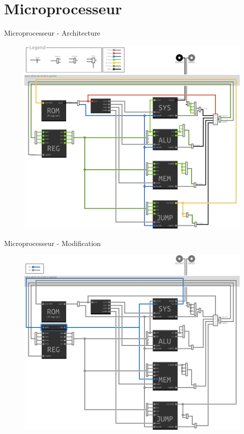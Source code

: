 \documentclass{beamer}
\begin{document}
\section{Microprocesseur}
\begin{frame}{Microprocesseur - Architecture}
	\begin{figure}
		\centering
		\includegraphics[width=\textwidth,height=0.9\textheight,keepaspectratio]{archi}
	\end{figure}
\end{frame}

\begin{frame}{Microprocesseur - Modification}
	\begin{figure}
		\centering
		\includegraphics[width=\textwidth,height=0.9\textheight,keepaspectratio]{archi_update}
	\end{figure}
\end{frame}
\end{document}
